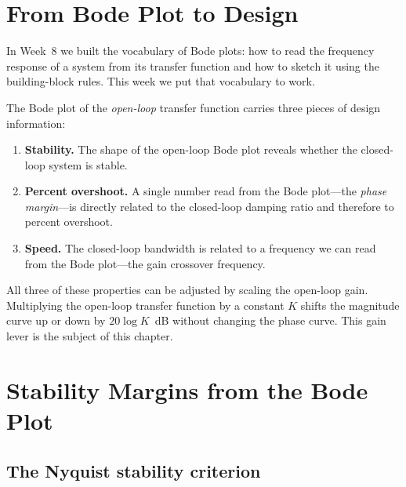 \documentclass[../../book.tex]{subfiles}
\begin{document}
\graphicspath{{../refs/images/}}

\section{From Bode Plot to Design}
\label{sec:intro}

In Week~8 we built the vocabulary of Bode plots: how to read the frequency
response of a system from its transfer function and how to sketch it using the
building-block rules.  This week we put that vocabulary to work.

The Bode plot of the \emph{open-loop} transfer function carries three pieces of
design information:

\begin{enumerate}
  \item \textbf{Stability.}  The shape of the open-loop Bode plot reveals
    whether the closed-loop system is stable.
  \item \textbf{Percent overshoot.}  A single number read from the Bode
    plot---the \emph{phase margin}---is directly related to the closed-loop
    damping ratio and therefore to percent overshoot.
  \item \textbf{Speed.}  The closed-loop bandwidth is related to a frequency
    we can read from the Bode plot---the gain crossover frequency.
\end{enumerate}

All three of these properties can be adjusted by scaling the open-loop gain.
Multiplying the open-loop transfer function by a constant $K$ shifts the
magnitude curve up or down by $20\log K$~dB without changing the phase curve.
This gain lever is the subject of this chapter.

\section{Stability Margins from the Bode Plot}
\label{sec:margins}

\subsection{The Nyquist stability criterion}
\label{sec:nyquist}
\end{document}

